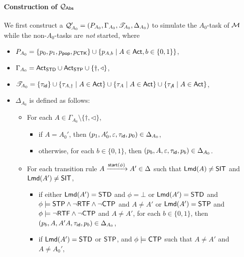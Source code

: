 {\paragraph{Construction of ${\mathcal{Q} }_{{\mathsf{Abs} }}$} 
We first construct a {\WOTrPDS} ${\mathcal{Q} }'_{A_0} = (P_{A_0},\Gamma_{A_0},{\mathscr{T} }_{A_0},\Delta_{A_0})$ to simulate the $A_0$-task of ${\mathcal{M} }$ while the non-$A_0$-tasks are \emph{not} started, where
\begin{itemize}
    \item $P_{A_0} = \{p_0,p_1, p_{\mathsf{pop}}, p_{{\sf CTK}}\}\cup\{p_{A,b}\mid A\in{\sf Act}, b\in\{0,1\}\}$,
    \item $\Gamma_{A_0} = {\sf Act}_{\mathsf{STD}} \cup {\sf Act}_{\mathsf{STP}} \cup \{\dag,\triangleleft\}$, 
    \item ${\mathscr{T} }_{A_0} = \{\tau_{\mathsf{id}} \}\cup \{\tau_{A, \dag} \mid A \in {\sf Act}\} \cup \{\tau_{A} \mid A \in {\sf Act}\}  \cup \{\tau_{\not A} \mid A \in {\sf Act}\}$,
    \item $\Delta_{A_0}$ is defined as follows:
            \begin{itemize}
                \item For each $A \in \Gamma_{A_0}\setminus\{\dag,\triangleleft\}$, 
                \begin{itemize}
                    \item if $A = A_0'$, then $(p_1,A_0',\varepsilon,\tau_{\mathsf{id}},p_0)\in\Delta_{A_0}$,
                    \item otherwise, for each $b\in\{0,1\}$, then $(p_b,A,\varepsilon,\tau_{\mathsf{id}},p_b)\in\Delta_{A_0}$.
                \end{itemize}
                \item For each transition rule $A\xrightarrow{{\mathsf{start} }(\phi)}A'\in\Delta$ such that ${\sf Lmd}(A)\neq\mathsf{SIT}$ and ${\sf Lmd}(A')\neq\mathsf{SIT}$,
                \begin{itemize}
                    \item if either ${\sf Lmd}(A') = \mathsf{STD}$ and $\phi = \bot$ or ${\sf Lmd}(A') = \mathsf{STD}$ and $\phi\models{\sf STP}\wedge\neg{\sf RTF}\wedge\neg{\sf CTP}$ and $A\neq A'$ or ${\sf Lmd}(A') = \mathsf{STP}$ and $\phi\models\neg{\sf RTF}\wedge\neg{\sf CTP}$ and $A\neq A'$, 
                    for each $b\in\{0,1\}$, then $(p_b, A, A'A, \tau_{\mathsf{id}}, p_b) \in \Delta_{A_0}$, 
                    \item if ${\sf Lmd}(A') = \mathsf{STD}$ or $\mathsf{STP}$, and $\phi\models {\sf CTP}$ such that $A\neq A'$ and $A\neq A_0'$,

\end{itemize}
\end{itemize}
\end{itemize}}
